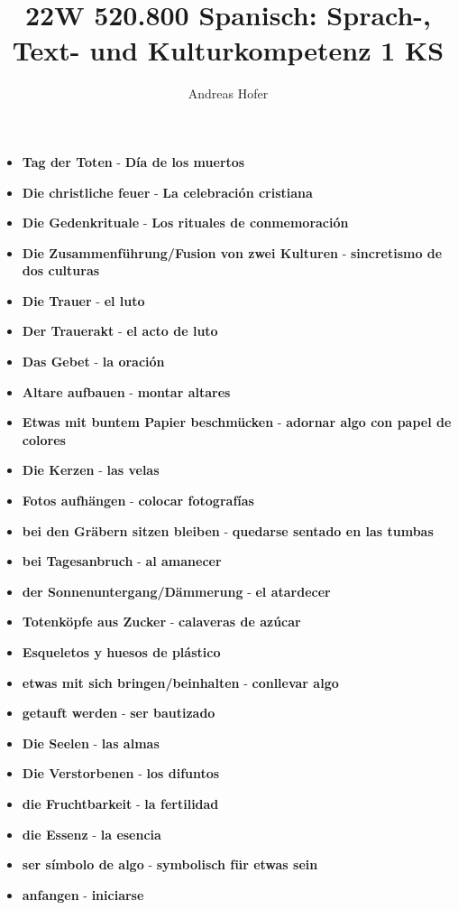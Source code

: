 \documentclass{article}
\title{\vspace{-3cm}22W 520.800 Spanisch: Sprach-, Text- und Kulturkompetenz 1 KS}
\author{Andreas Hofer}
\begin{document}
	\begin{multicols}{2}
	\begin{itemize}
		\item{\textbf{Tag der Toten} - \textbf{Día de los muertos}}
		\item{\textbf{Die christliche feuer} - \textbf{La celebración cristiana}}
		\item{\textbf{Die Gedenkrituale} - \textbf{Los rituales de conmemoración}}
		\item{\textbf{Die Zusammenführung/Fusion von zwei Kulturen} - \textbf{sincretismo de dos culturas}}
		\item{\textbf{Die Trauer} - \textbf{el luto}}
		\item{\textbf{Der Trauerakt} - \textbf{el acto de luto}}
		\item{\textbf{Das Gebet} - \textbf{la oración}}
		\item{\textbf{Altare aufbauen} - \textbf{montar altares}}
		\item{\textbf{Etwas mit buntem Papier beschmücken} - \textbf{adornar algo con papel de colores}}
		\item{\textbf{Die Kerzen} - \textbf{las velas}}
		\item{\textbf{Fotos aufhängen} - \textbf{colocar fotografías}}
		\item{\textbf{bei den Gräbern sitzen bleiben} - \textbf{quedarse sentado en las tumbas}}
		\item{\textbf{bei Tagesanbruch} - \textbf{al amanecer}}
		\item{\textbf{der Sonnenuntergang/Dämmerung} - \textbf{el atardecer}}
		\item{\textbf{Totenköpfe aus Zucker} - \textbf{calaveras de azúcar}}
		\item{\textbf{Esqueletos y huesos de plástico}}
		\item{\textbf{etwas mit sich bringen/beinhalten} - \textbf{conllevar algo}}
		\item{\textbf{getauft werden} - \textbf{ser bautizado}}
		\item{\textbf{Die Seelen} - \textbf{las almas}}
		\item{\textbf{Die Verstorbenen} - \textbf{los difuntos}}
		\item{\textbf{die Fruchtbarkeit} - \textbf{la fertilidad}}
		\item{\textbf{die Essenz} - \textbf{la esencia}}
		\item{\textbf{ser símbolo de algo} - \textbf{symbolisch für etwas sein}}
		\item{\textbf{anfangen} - \textbf{iniciarse}}

\end{itemize}
\end{multicols}
\end{document}
